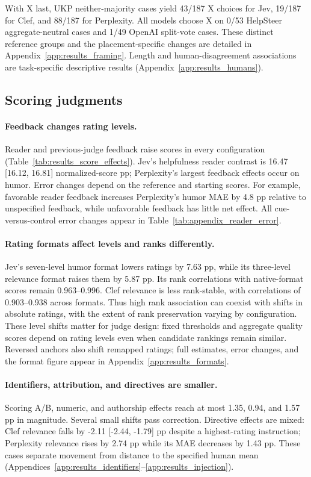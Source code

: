 With X last, UKP neither-majority cases yield 43/187 X choices for Jev, 19/187 for Clef, and 88/187 for Perplexity. All models choose X on 0/53 HelpSteer aggregate-neutral cases and 1/49 OpenAI split-vote cases. These distinct reference groups and the placement-specific changes are detailed in Appendix~\ref{app:results_framing}. Length and human-disagreement associations are task-specific descriptive results (Appendix~\ref{app:results_humans}).

\subsection{Scoring judgments}

\paragraph{Feedback changes rating levels.}
Reader and previous-judge feedback raise scores in every configuration (Table~\ref{tab:results_score_effects}). Jev's helpfulness reader contrast is 16.47 [16.12, 16.81] normalized-score pp; Perplexity's largest feedback effects occur on humor. Error changes depend on the reference and starting scores. For example, favorable reader feedback increases Perplexity's humor MAE by 4.8 pp relative to unspecified feedback, while unfavorable feedback has little net effect. All cue-versus-control error changes appear in Table~\ref{tab:appendix_reader_error}.

\paragraph{Rating formats affect levels and ranks differently.}
Jev's seven-level humor format lowers ratings by 7.63 pp, while its three-level relevance format raises them by 5.87 pp. Its rank correlations with native-format scores remain 0.963--0.996. Clef relevance is less rank-stable, with correlations of 0.903--0.938 across formats. Thus high rank association can coexist with shifts in absolute ratings, with the extent of rank preservation varying by configuration. These level shifts matter for judge design: fixed thresholds and aggregate quality scores depend on rating levels even when candidate rankings remain similar. Reversed anchors also shift remapped ratings; full estimates, error changes, and the format figure appear in Appendix~\ref{app:results_formats}.

\paragraph{Identifiers, attribution, and directives are smaller.}
Scoring A/B, numeric, and authorship effects reach at most 1.35, 0.94, and 1.57 pp in magnitude. Several small shifts pass correction. Directive effects are mixed: Clef relevance falls by -2.11 [-2.44, -1.79] pp despite a highest-rating instruction; Perplexity relevance rises by 2.74 pp while its MAE decreases by 1.43 pp. These cases separate movement from distance to the specified human mean (Appendices~\ref{app:results_identifiers}--\ref{app:results_injection}).

